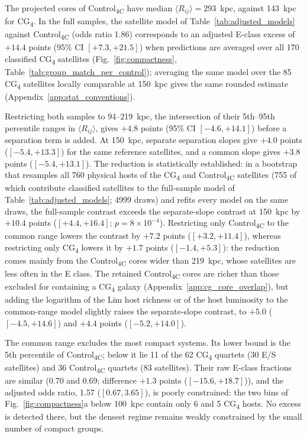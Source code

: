 \documentclass{aa}
\newcommand{\CC}{Control\textsubscript{4C}}
\newcommand{\CG}{CG\textsubscript{4}}
\newcommand{\Rmed}{\langle R_{ij}\rangle}
\begin{document}
The projected cores of \CC{} have median \(\Rmed=293\)~kpc, against 143~kpc for \CG{}. In the full samples, the satellite model of Table~\ref{tab:adjusted_models} against \CC{} (odds ratio 1.86) corresponds to an adjusted E-class excess of \(+14.4\) points (95\% CI \([+7.3, +21.5]\)) when predictions are averaged over all 170 classified \CG{} satellites (Fig.~\ref{fig:compactness}, Table~\ref{tab:group_match_per_control}); averaging the same model over the 85 \CG{} satellites locally comparable at 150~kpc gives the same rounded estimate (Appendix~\ref{app:stat_conventions}).

Restricting both samples to 94--219~kpc, the intersection of their 5th--95th percentile ranges in \(\Rmed\), gives \(+4.8\) points (95\% CI \([-4.6, +14.1]\)) before a separation term is added. At 150~kpc, separate separation slopes give \(+4.0\) points (\([-5.4, +13.3]\)) for the same reference satellites, and a common slope gives \(+3.8\) points (\([-5.4, +13.1]\)). The reduction is statistically established: in a bootstrap that resamples all 760 physical hosts of the \CG{} and \CC{} satellites (755 of which contribute classified satellites to the full-sample model of Table~\ref{tab:adjusted_models}; 4999 draws) and refits every model on the same draws, the full-sample contrast exceeds the separate-slope contrast at 150~kpc by \(+10.4\) points (\([+4.4, +16.4]\); \(p = 8\times 10^{-4}\)). Restricting only \CC{} to the common range lowers the contrast by \(+7.2\) points (\([+3.2, +11.4]\)), whereas restricting only \CG{} lowers it by \(+1.7\) points (\([-1.4, +5.3]\)): the reduction comes mainly from the \CC{} cores wider than 219~kpc, whose satellites are less often in the E class. The retained \CC{} cores are richer than those excluded for containing a \CG{} galaxy (Appendix~\ref{app:cg_core_overlap}), but adding the logarithm of the Lim host richness or of the host luminosity to the common-range model slightly raises the separate-slope contrast, to \(+5.0\) (\([-4.5, +14.6]\)) and \(+4.4\) points (\([-5.2, +14.0]\)).

The common range excludes the most compact systems. Its lower bound is the 5th percentile of \CC{}; below it lie 11 of the 62 \CG{} quartets (30 E/S satellites) and 36 \CC{} quartets (83 satellites). Their raw E-class fractions are similar (0.70 and 0.69; difference \(+1.3\) points (\([-15.6, +18.7]\))), and the adjusted odds ratio, 1.57 (\([0.67, 3.65]\)), is poorly constrained: the two bins of Fig.~\ref{fig:compactness}a below 100~kpc contain only 6 and 5 \CG{} hosts. No excess is detected there, but the densest regime remains weakly constrained by the small number of compact groups.
\end{document}
